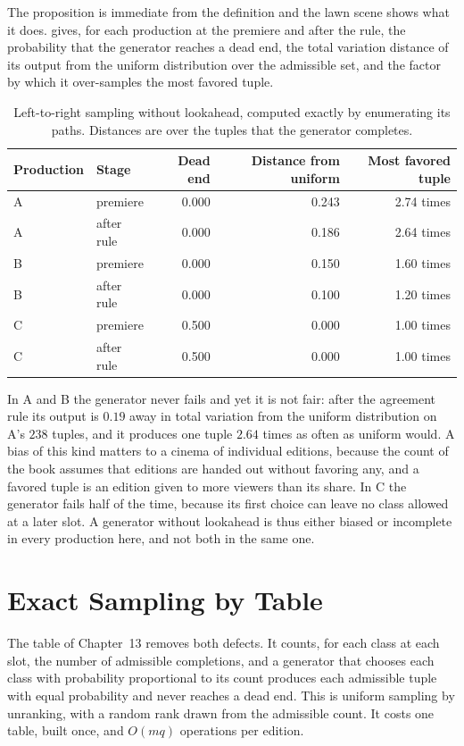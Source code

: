 \documentclass[11pt,twoside,openright]{book}
\theoremstyle{plain}
\theoremstyle{definition}
\theoremstyle{remark}
\begin{document}
The proposition is immediate from the definition and the lawn scene shows what it does.  gives, for each production at the premiere and after the rule, the probability that the generator reaches a dead end, the total variation distance of its output from the uniform distribution over the admissible set, and the factor by which it over-samples the most favored tuple.

\begin{table}[ht]
\centering
\begin{tabular}{@{}llrrr@{}}
\toprule
Production & Stage & Dead end & Distance from uniform & Most favored tuple\\
\midrule
A & premiere & 0.000 & 0.243 & 2.74 times\\
A & after rule & 0.000 & 0.186 & 2.64 times\\
B & premiere & 0.000 & 0.150 & 1.60 times\\
B & after rule & 0.000 & 0.100 & 1.20 times\\
C & premiere & 0.500 & 0.000 & 1.00 times\\
C & after rule & 0.500 & 0.000 & 1.00 times\\
\bottomrule
\end{tabular}
\caption{Left-to-right sampling without lookahead, computed exactly by enumerating its paths. Distances are over the tuples that the generator completes.}\label{tab:local16}
\end{table}

In A and B the generator never fails and yet it is not fair: after the agreement rule its output is $0.19$ away in total variation from the uniform distribution on A's $238$ tuples, and it produces one tuple $2.64$ times as often as uniform would. A bias of this kind matters to a cinema of individual editions, because the count of the book assumes that editions are handed out without favoring any, and a favored tuple is an edition given to more viewers than its share. In C the generator fails half of the time, because its first choice can leave no class allowed at a later slot. A generator without lookahead is thus either biased or incomplete in every production here, and not both in the same one.

\section{Exact Sampling by Table}\label{sec:table16}

The table of Chapter~13 removes both defects. It counts, for each class at each slot, the number of admissible completions, and a generator that chooses each class with probability proportional to its count produces each admissible tuple with equal probability and never reaches a dead end. This is uniform sampling by unranking, with a random rank drawn from the admissible count. It costs one table, built once, and $O(mq)$ operations per edition.
\end{document}
